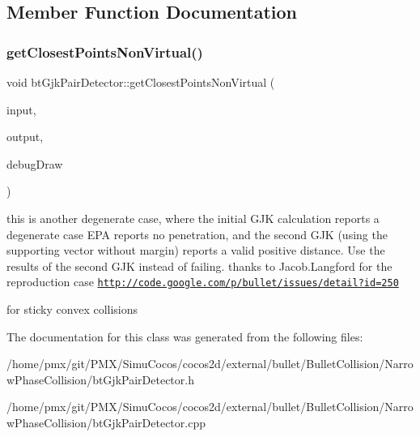 \subsection{Member Function Documentation}
\mbox{\label{classbtGjkPairDetector_abc29953dd7aee59e9ca887963c26c8c2}} 
\subsubsection{\texorpdfstring{get\+Closest\+Points\+Non\+Virtual()}{getClosestPointsNonVirtual()}}
{\footnotesize\ttfamily void bt\+Gjk\+Pair\+Detector\+::get\+Closest\+Points\+Non\+Virtual (\begin{DoxyParamCaption}\item[{const \hyperlink{structbtDiscreteCollisionDetectorInterface_1_1ClosestPointInput}{Closest\+Point\+Input} \&}]{input,  }\item[{\hyperlink{structbtDiscreteCollisionDetectorInterface_1_1Result}{Result} \&}]{output,  }\item[{class \hyperlink{classbtIDebugDraw}{bt\+I\+Debug\+Draw} $\ast$}]{debug\+Draw }\end{DoxyParamCaption})}

this is another degenerate case, where the initial G\+JK calculation reports a degenerate case E\+PA reports no penetration, and the second G\+JK (using the supporting vector without margin) reports a valid positive distance. Use the results of the second G\+JK instead of failing. thanks to Jacob.\+Langford for the reproduction case \href{http://code.google.com/p/bullet/issues/detail?id=250}{\tt http\+://code.\+google.\+com/p/bullet/issues/detail?id=250}

for sticky convex collisions 

The documentation for this class was generated from the following files\+:\begin{DoxyCompactItemize}
\item 
/home/pmx/git/\+P\+M\+X/\+Simu\+Cocos/cocos2d/external/bullet/\+Bullet\+Collision/\+Narrow\+Phase\+Collision/bt\+Gjk\+Pair\+Detector.\+h\item 
/home/pmx/git/\+P\+M\+X/\+Simu\+Cocos/cocos2d/external/bullet/\+Bullet\+Collision/\+Narrow\+Phase\+Collision/bt\+Gjk\+Pair\+Detector.\+cpp\end{DoxyCompactItemize}
